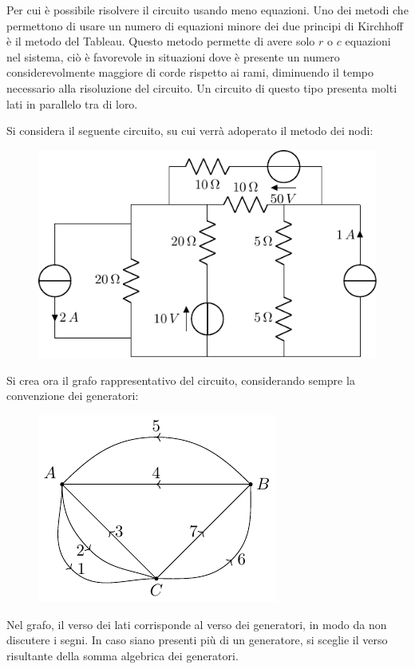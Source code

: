 \documentclass{article}
\numberwithin{equation}{subsection}
\begin{document}
Per cui è possibile risolvere il circuito usando meno equazioni. Uno dei metodi che permettono di usare un numero di equazioni minore dei due principi di Kirchhoff è il metodo 
del Tableau. Questo metodo permette di avere solo $r$ o $c$ equazioni nel sistema, ciò è favorevole in situazioni dove è presente un numero considerevolmente maggiore di 
corde rispetto ai rami, diminuendo il tempo necessario alla risoluzione del circuito. Un circuito di questo tipo presenta molti lati in parallelo tra di loro. 

Si considera il seguente circuito, su cui verrà adoperato il metodo dei nodi:
\begin{figure}[H]%
    \centering
    \includegraphics{circuito-1.pdf}
    \label{fig:circuito-1}
\end{figure}
Si crea ora il grafo rappresentativo del circuito, considerando sempre la convenzione dei generatori: 
\begin{figure}[H]%
    \centering
    \includegraphics{grafo-circuito-1.pdf}
    \label{fig:grafo-circuito-1}
\end{figure}

Nel grafo, il verso dei lati corrisponde al verso dei generatori, in modo da non discutere i segni. In caso siano presenti più di un generatore, si sceglie il verso risultante 
della somma algebrica dei generatori. %
\end{document}
